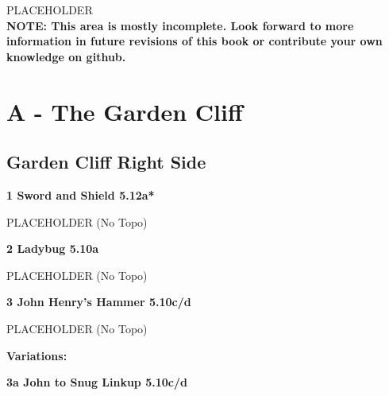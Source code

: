 

\raggedcolumns
\begin{multicols}{2}
PLACEHOLDER\\

\textbf{NOTE: This area is mostly incomplete. Look forward to more information in future revisions of this book or contribute your own knowledge on github.}\\

\newpage
		\section{A - The Garden Cliff}\label{sa:The Garden Cliff}
	
	
			\subsection*{Garden Cliff Right Side}\label{bf:Garden Cliff Right Side}
						
					\label{rt:Sword and Shield}
\colorbox{Goldenrod!50}{
\parbox{0.95\linewidth}{
\textbf{
1 Sword and Shield 5.12a*  
}
}
}

					\begin{adjustwidth}{0.5cm}{}				
					PLACEHOLDER
						\newline (No Topo) 
					\end{adjustwidth}
					\label{rt:Ladybug}
\colorbox{RoyalBlue!20}{
\parbox{0.95\linewidth}{
\textbf{
2 Ladybug 5.10a  
}
}
}

					\begin{adjustwidth}{0.5cm}{}				
					PLACEHOLDER
						\newline (No Topo) 
					\end{adjustwidth}
					\label{rt:John Henry's Hammer}
\colorbox{RoyalBlue!20}{
\parbox{0.95\linewidth}{
\textbf{
3 John Henry's Hammer 5.10c/d  
}
}
}

					\begin{adjustwidth}{0.5cm}{}				
					PLACEHOLDER
						\newline (No Topo) 
					\end{adjustwidth}
						\begin{adjustwidth}{0.5cm}{}				
						\textbf{Variations:} \newline
							\label{vr:John to Snug Linkup}
\colorbox{RoyalBlue!20}{
\parbox{0.95\linewidth}{
\textbf{
3a John to Snug Linkup 5.10c/d  
}
}
}


\end{adjustwidth}
\end{multicols}

